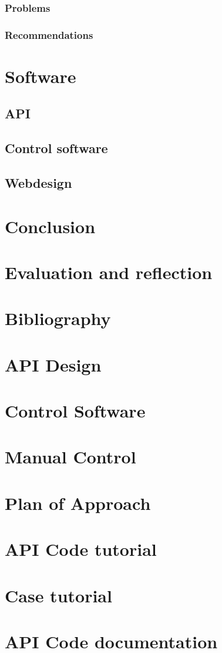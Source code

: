 \documentclass[a4paper,oneside]{book}
\begin{document}
\subsection{Problems}
\subsection{Recommendations}

\chapter{Software}
\label{ch:software}
\section{API}
\section{Control software}
\section{Webdesign}

\chapter{Conclusion}
\chapter{Evaluation and reflection}
\chapter{Bibliography}



\appendix
\chapter{API Design}
\chapter{Control Software}
\chapter{Manual Control}
\chapter{Plan of Approach}
\label{app:plan-of-approach}
\chapter{API Code tutorial}
\chapter{Case tutorial}
\chapter{API Code documentation}
\end{document}

